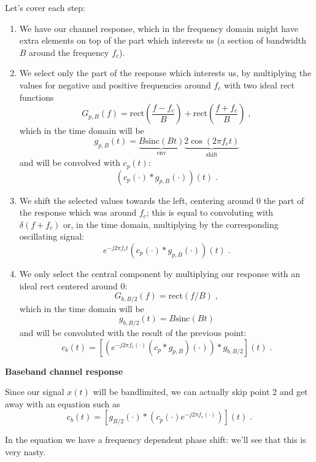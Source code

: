 \documentclass[a4paper, 12pt]{book}
\begin{document}
Let's cover each step:
\begin{enumerate}
    \item We have our channel response, which in the frequency domain might have extra elements on top of the part which interests us (a section of bandwidth $B$ around the frequency $f_c$).
    \item We select only the part of the response which interests us, by multiplying the values for negative and positive frequencies around $f_c$ with two ideal rect functions
    $$
    G_{p, B}(f) = \text{rect}\left(\frac{f-f_c}{B}\right) + \text{rect}\left(\frac{f+f_c}{B}\right) \;,
    $$
    \clearpage %
    which in the time domain will be
    $$
    g_{p, B}(t) = \underbrace{B \text{sinc}(Bt)}_{\text{env}} \underbrace{2 \cos(2\pi f_c t)}_{\text{shift}}
    $$
    and will be convolved with $c_p(t)$:
    $$
    (c_p(\cdot) * g_{p, B}(\cdot))(t) \;.
    $$
    \item We shift the selected values towards the left, centering around 0 the part of the response which was around $f_c$; this is equal to convoluting with $\delta(f+f_c)$ or, in the time domain, multiplying by the corresponding oscillating signal:
    $$
    e^{-j2\pi f_c t} (c_p(\cdot) * g_{p, B}(\cdot))(t) \;.
    $$
    \item We only select the central component by multiplying our response with an ideal rect centered around 0:
    $$
    G_{b, B/2}(f) = \text{rect}(f/B) \;,
    $$
    which in the time domain will be
    \begin{equation}
    g_{b, B/2}(t) = B \text{sinc}(Bt) \tag{2.12}
    \end{equation}
    and will be convoluted with the result of the previous point:
    $$
    c_b(t) = \left[ \left( e^{-j2\pi f_c (\cdot)} (c_p * g_{p, B})(\cdot) \right) * g_{b, B/2} \right](t) \;.
    $$
\end{enumerate}

\begin{tcolorbox}[colframe=cyan!80!blue, colback=white, boxrule=1pt, arc=2pt]
    \textcolor{cyan!80!blue}{\textbf{Baseband channel response}}

    Since our signal $x(t)$ will be bandlimited, we can actually skip point 2 and get away with an equation such as
    $$
    c_b(t) = [ g_{B/2}(\cdot) * (c_p(\cdot) e^{-j2\pi f_c (\cdot)}) ] (t) \;.
    $$
    \begin{tcolorbox}[sharp corners, boxrule=0pt, leftrule=2pt, colframe=green!60!black, colback=green!5, left=5pt, top=3pt, bottom=3pt]
    In the equation we have a frequency dependent phase shift: we'll see that this is very nasty.
    \end{tcolorbox}
\end{tcolorbox}
\end{document}

